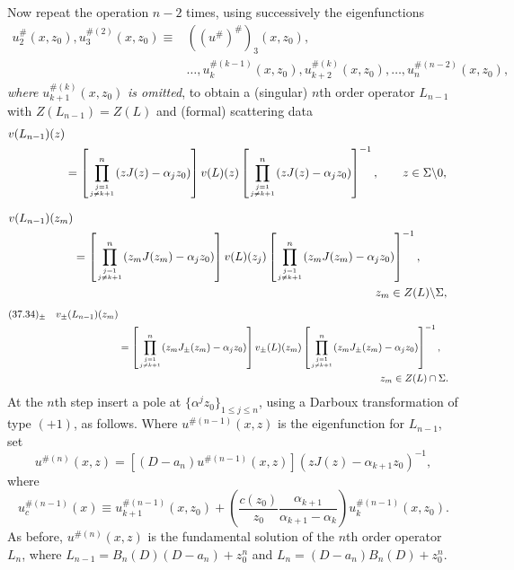 \documentclass{surv-l}
\theoremstyle{plain}
\theoremstyle{definition}
\numberwithin{equation}{chapter}
\begin{document}
Now repeat the operation $n-2$ times, using successively the eigenfunctions
\begin{align*}
u_{2}^{\#}(x,z_{0}),u_{3}^{\#(2)}(x, z_{0}) \equiv&((u^{\#})^{\#})_{3}(x, z_{0}),\\
& \ldots,u_{k}^{\#(k-1)}(x,z_{0}),u_{k+2}^{\#(k)}(x, z_{0}),\ldots,u_{n}^{\#(n-2)}(x,z_{0}),
\end{align*}
\emph{where} $u_{k+1}^{\#(k)}(x,z_{0})$ \emph{is omitted}, to obtain a (singular) $n$th order operator $L_{n-1}$ with $Z(L_{n-1})=Z(L)$ and (formal) scattering data
\setcounter{equation}{31}
\begin{align}\label{eq37.32}
v(L_{n-1})(z)\\
& =\left[ \prod_{{j=1}\atop{j\neq k+1}}^{n} (zJ(z)- \alpha_{j}z_{0})\right]v(L)(z)\left[\prod_{{j=1}\atop{j\neq k+1}}^{n}(zJ(z)-\alpha_{j}z_{0})\right]^{-1}, \qquad z\in\Sigma\backslash 0,\notag
\end{align}

\begin{align}\label{eq37.33}
v(L_{n-1})(z_{m})\\
& = \left[\prod_{{j=1}\atop{j\neq k+1}}^{n}(z_{m}J(z_{m})-\alpha_{j}z_{0})\right]v(L)(z_{j})\left[\prod_{{j=1}\atop{j\neq k+1}}^{n}(z_{m}J(z_{m})-\alpha_{j}z_{0})\right]^{-1},\notag\\
& \qquad  \qquad  \qquad \qquad \qquad  \qquad  \qquad \qquad \qquad  \qquad  \qquad \qquad \qquad   z_{m}\in Z(L)\backslash \Sigma, \notag
\end{align}
\begin{align*}
(37.34)_{\pm}\quad v_{\pm}(L_{n-1})(z_{m})\\
& =\left[\prod_{{j=1}\atop{j\neq k+1}}^{n}(z_{m}J_{\pm}(z_{m})-\alpha_{j}z_{0})\right]v_{\pm}(L)(z_{m})\left[\prod_{{j=1}\atop{j\neq k+1}}^{n}(z_{m}J_{\pm}(z_{m})-\alpha_{j}z_{0})\right]^{-1},\notag \\
&  \qquad  \qquad  \qquad \qquad  \qquad  \qquad  \qquad \qquad \qquad  \qquad  \qquad \qquad \qquad   {z_{m}\in Z(L)\cap\Sigma}.\notag
\end{align*}
At the $n$th step insert a pole at $\{\alpha^{j}z_{0}\}_{1\leq j\leq n}$, using a Darboux transformation of type $(+1)$, as follows. Where $u^{\#(n-1)}(x, z)$ is the eigenfunction for $L_{n-1}$, set
\setcounter{equation}{34}
\begin{equation}\label{eq37.35}
u^{\#(n)}(x,z)=[(D-a_{n})u^{\#(n-1)}(x, z)](zJ(z) -\alpha_{k+1}z_{0})^{-1},
\end{equation}
where
\begin{equation}\label{eq37.36}
u_{c}^{\#(n-1)}(x)\equiv u_{k+1}^{\#(n-1)}(x, z_{0})+\left(\frac{c(z_{0})}{z_{0}}\frac{\alpha_{k+1}}{\alpha_{k+1}-\alpha_{k}}\right)u_{k}^{\#(n-1)}(x, z_{0}).
\end{equation}
As before, $u^{\#(n)}(x, z)$ is the fundamental solution of the $n$th order operator $L_{n}$, where $L_{n-1}=B_{n}(D)(D-a_{n})+z_{0}^{n}$ and $L_{n}=(D-a_{n})B_{n}(D)+z_{0}^{n}$.
\end{document}
